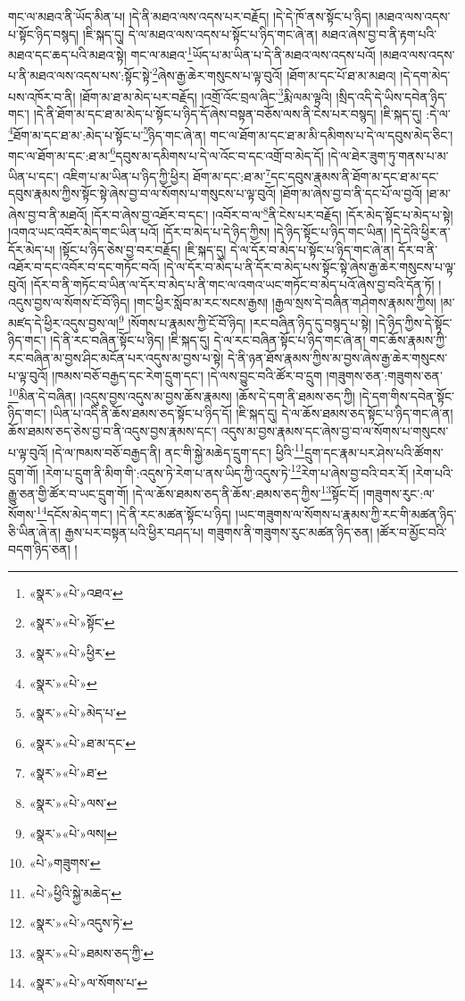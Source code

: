 གང་ལ་མཐའ་ནི་ཡོད་མིན་པ། །དེ་ནི་མཐའ་ལས་འདས་པར་བརྗོད། །དེ་དེ་ཁོ་ནས་སྟོང་པ་ཉིད། །མཐའ་ལས་འདས་པ་སྟོང་ཉིད་བསྙད། །ཇི་སྐད་དུ། དེ་ལ་མཐའ་ལས་འདས་པ་སྟོང་པ་ཉིད་གང་ཞེ་ན། མཐའ་ཞེས་བྱ་བ་ནི་རྟག་པའི་མཐའ་དང་ཆད་པའི་མཐའ་སྟེ། གང་ལ་མཐའ་\footnote{«སྣར་»«པེ་»འཐའ་}ཡོད་པ་མ་ཡིན་པ་དེ་ནི་མཐའ་ལས་འདས་པའོ། །མཐའ་ལས་འདས་པ་ནི་མཐའ་ལས་འདས་པས་:སྟོང་སྟེ་\footnote{«སྣར་»«པེ་»སྟོང་}ཞེས་རྒྱ་ཆེར་གསུངས་པ་ལྟ་བུའོ། །ཐོག་མ་དང་པོ་ཐ་མ་མཐའ། །དེ་དག་མེད་པས་འཁོར་བ་ནི། །ཐོག་མ་ཐ་མ་མེད་པར་བརྗོད། །འགྲོ་འོང་བྲལ་ཞིང་\footnote{«སྣར་»«པེ་»ཕྱིར་}རྨི་ལམ་ལྟའི། །སྲིད་འདི་དེ་ཡིས་དབེན་ཉིད་གང་། །དེ་ནི་ཐོག་མ་དང་ཐ་མ་མེད་པ་སྟོང་པ་ཉིད་དོ་ཞེས་བསྟན་བཅོས་ལས་ནི་ངེས་པར་བསྙད། །ཇི་སྐད་དུ། :དེ་ལ་\footnote{«སྣར་»«པེ་»}ཐོག་མ་དང་ཐ་མ་:མེད་པ་སྟོང་པ་\footnote{«སྣར་»«པེ་»མེད་པ་}ཉིད་གང་ཞེ་ན། གང་ལ་ཐོག་མ་དང་ཐ་མ་མི་དམིགས་པ་དེ་ལ་དབུས་མེད་ཅིང་། གང་ལ་ཐོག་མ་དང་:ཐ་མ་\footnote{«སྣར་»«པེ་»ཐ་མ་དང་}དབུས་མ་དམིགས་པ་དེ་ལ་འོང་བ་དང་འགྲོ་བ་མེད་དོ། །དེ་ལ་ཐེར་ཟུག་ཏུ་གནས་པ་མ་ཡིན་པ་དང་། འཇིག་པ་མ་ཡིན་པ་ཉིད་ཀྱི་ཕྱིར། ཐོག་མ་དང་:ཐ་མ་\footnote{«སྣར་»«པེ་»ཐ་}དང་དབུས་རྣམས་ནི་ཐོག་མ་དང་ཐ་མ་དང་དབུས་རྣམས་ཀྱིས་སྟོང་སྟེ་ཞེས་བྱ་བ་ལ་སོགས་པ་གསུངས་པ་ལྟ་བུའོ། །ཐོག་མ་ཞེས་བྱ་བ་ནི་དང་པོ་ལ་བྱའོ། །ཐ་མ་ཞེས་བྱ་བ་ནི་མཐའོ། །དོར་བ་ཞེས་བྱ་འཐོར་བ་དང་། །འབོར་བ་ལ་\footnote{«སྣར་»«པེ་»ལས་}ནི་ངེས་པར་བརྗོད། །དོར་མེད་སྟོང་པ་མེད་པ་སྟེ། །འགའ་ཡང་འབོར་མེད་གང་ཡིན་པའོ། །དོར་བ་མེད་པ་དེ་ཉིད་ཀྱིས། །དེ་ཉིད་སྟོང་པ་ཉིད་གང་ཡིན། །དེ་དེའི་ཕྱིར་ན་དོར་མེད་པ། །སྟོང་པ་ཉིད་ཅེས་བྱ་བར་བརྗོད། །ཇི་སྐད་དུ། དེ་ལ་དོར་བ་མེད་པ་སྟོང་པ་ཉིད་གང་ཞེ་ན། དོར་བ་ནི་འཐོར་བ་དང་འབོར་བ་དང་གཏོང་བའོ། །དེ་ལ་དོར་བ་མེད་པ་ནི་དོར་བ་མེད་པས་སྟོང་སྟེ་ཞེས་རྒྱ་ཆེར་གསུངས་པ་ལྟ་བུའོ། །དོར་བ་ནི་གཏོང་བ་ཡིན་ལ་དོར་བ་མེད་པ་ནི་གང་ལ་འགའ་ཡང་གཏོང་བ་མེད་པའོ་ཞེས་བྱ་བའི་དོན་ཏོ། །འདུས་བྱས་ལ་སོགས་ངོ་བོ་ཉིད། །གང་ཕྱིར་སློབ་མ་རང་སངས་རྒྱས། །རྒྱལ་སྲས་དེ་བཞིན་གཤེགས་རྣམས་ཀྱིས། །མ་མཛད་དེ་ཕྱིར་འདུས་བྱས་ལ།\footnote{«སྣར་»«པེ་»ལས།} །སོགས་པ་རྣམས་ཀྱི་ངོ་བོ་ཉིད། །རང་བཞིན་ཉིད་དུ་བསྙད་པ་སྟེ། །དེ་ཉིད་ཀྱིས་དེ་སྟོང་ཉིད་གང་། །དེ་ནི་རང་བཞིན་སྟོང་པ་ཉིད། །ཇི་སྐད་དུ། དེ་ལ་རང་བཞིན་སྟོང་པ་ཉིད་གང་ཞེ་ན། གང་ཆོས་རྣམས་ཀྱི་རང་བཞིན་མ་བྱས་ཤིང་མངོན་པར་འདུས་མ་བྱས་པ་སྟེ། དེ་ནི་ཉན་ཐོས་རྣམས་ཀྱིས་མ་བྱས་ཞེས་རྒྱ་ཆེར་གསུངས་པ་ལྟ་བུའོ། །ཁམས་བཅོ་བརྒྱད་དང་རེག་དྲུག་དང་། །དེ་ལས་བྱུང་བའི་ཚོར་བ་དྲུག །གཟུགས་ཅན་:གཟུགས་ཅན་\footnote{«པེ་»གཟུགས་}མིན་དེ་བཞིན། །འདུས་བྱས་འདུས་མ་བྱས་ཆོས་རྣམས། །ཆོས་དེ་དག་ནི་ཐམས་ཅད་ཀྱི། །དེ་དག་གིས་དབེན་སྟོང་ཉིད་གང་། །ཡིན་པ་འདི་ནི་ཆོས་ཐམས་ཅད་སྟོང་པ་ཉིད་དོ། །ཇི་སྐད་དུ། དེ་ལ་ཆོས་ཐམས་ཅད་སྟོང་པ་ཉིད་གང་ཞེ་ན། ཆོས་ཐམས་ཅད་ཅེས་བྱ་བ་ནི་འདུས་བྱས་རྣམས་དང་། འདུས་མ་བྱས་རྣམས་དང་ཞེས་བྱ་བ་ལ་སོགས་པ་གསུངས་པ་ལྟ་བུའོ། །དེ་ལ་ཁམས་བཅོ་བརྒྱད་ནི། ནང་གི་སྐྱེ་མཆེད་དྲུག་དང་། ཕྱིའི་\footnote{«པེ་»ཕྱིའི་སྐྱེ་མཆེད་}དྲུག་དང་རྣམ་པར་ཤེས་པའི་ཚོགས་དྲུག་གོ། །རེག་པ་དྲུག་ནི་མིག་གི་:འདུས་ཏེ་རེག་པ་ནས་ཡིད་ཀྱི་འདུས་ཏེ་\footnote{«སྣར་»«པེ་»འདུས་ཏེ་}རེག་པ་ཞེས་བྱ་བའི་བར་རོ། །རེག་པའི་རྒྱུ་ཅན་གྱི་ཚོར་བ་ཡང་དྲུག་གོ། །དེ་ལ་ཆོས་ཐམས་ཅད་ནི་ཆོས་:ཐམས་ཅད་ཀྱིས་\footnote{«སྣར་»«པེ་»ཐམས་ཅད་ཀྱི་}སྟོང་ངོ། །གཟུགས་རུང་:ལ་སོགས་\footnote{«སྣར་»«པེ་»ལ་སོགས་པ་}དངོས་མེད་གང་། །དེ་ནི་རང་མཚན་སྟོང་པ་ཉིད། །ཡང་གཟུགས་ལ་སོགས་པ་རྣམས་ཀྱི་རང་གི་མཚན་ཉིད་ཅི་ཡིན་ཞེ་ན། རྒྱས་པར་བསྟན་པའི་ཕྱིར་བཤད་པ། གཟུགས་ནི་གཟུགས་རུང་མཚན་ཉིད་ཅན། །ཚོར་བ་མྱོང་བའི་བདག་ཉིད་ཅན། །

